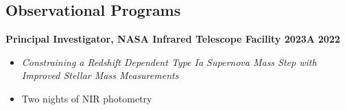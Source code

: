 \documentclass[margin]{res}
\begin{document}
\begin{resume}






\section{Observational Programs} %

{\bf Principal Investigator, NASA Infrared Telescope Facility 2023A} \hfill \textbf{2022} 
\begin{itemize} \itemsep -2pt %
     \item[] \textit{Constraining a Redshift Dependent Type Ia Supernova Mass Step with \\Improved Stellar Mass Measurements}
     \item[] Two nights of NIR photometry
 \end{itemize} \vspace{-12pt}
 \newpage



\end{resume}
\end{document}
